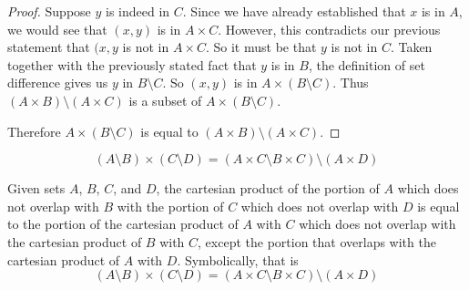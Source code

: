 \documentclass[main.tex]{subfiles}
\begin{document}
\begin{proof}
	Suppose \(y\) is indeed in \(C\). Since we have already established that
	\(x\) is in \(A\), we would see that \((x,y)\) is in \(A \times C\).
	However, this contradicts our previous statement that \((x,y\) is not in
	\(A \times C\). So it must be that \(y\) is not in \(C\). Taken together
	with the previously stated fact that \(y\) is in \(B\), the definition
	of set difference gives us \(y\) in \(B \setminus C\). So \((x,y)\) is
	in \(A \times (B \setminus C)\). Thus
	\((A \times B) \setminus (A \times C)\) is a subset of
	\(A \times (B \setminus C)\).

	\medskip
	Therefore \(A \times (B \setminus C)\) is equal to
	\((A \times B) \setminus (A \times C)\).
\end{proof}

\subproblem{}\label{2p}
\[(A \setminus B) \times (C \setminus D) = (A \times C \setminus B \times C) \setminus (A \times D)\]
\begin{thm}
	Given sets \(A\), \(B\), \(C\), and \(D\), the cartesian product of the
	portion of \(A\) which does not overlap with \(B\) with the portion of
	\(C\) which does not overlap with \(D\) is equal to the portion of the
	cartesian product of \(A\) with \(C\) which does not overlap with the
	cartesian product of \(B\) with \(C\), except the portion that overlaps
	with the cartesian product of \(A\) with \(D\). Symbolically, that is
	\[(A \setminus B) \times (C \setminus D) = (A \times C \setminus B \times C) \setminus (A \times D)\]
\end{thm}
\end{document}
